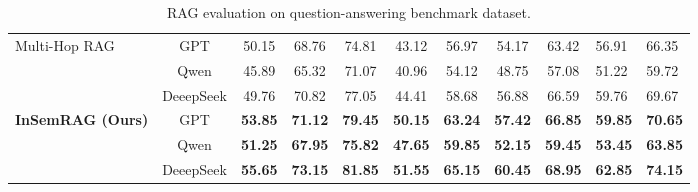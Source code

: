 \begin{table}[!htb]
\begin{threeparttable}
\begin{tabular}{|p{45pt}|c|c|c|c|c|c|c|c|p{30pt}|p{30pt}|}
        \hline
        \multirow{3}{40pt}{Multi-Hop RAG} & GPT & 50.15 & 68.76 & 74.81 & 43.12 & 56.97 & 54.17 & 63.42 & 56.91 & 66.35\\
        & Qwen & 45.89 & 65.32 & 71.07 & 40.96 & 54.12 & 48.75 & 57.08 & 51.22 & 59.72\\
        & DeeepSeek & 49.76 & 70.82 & 77.05 & 44.41 & 58.68 & 56.88 & 66.59 & 59.76 & 69.67\\
        \hline
        \multirow{3}{40pt}{\textbf{InSemRAG (Ours)}} & GPT & \textbf{53.85} & \textbf{71.12} & \textbf{79.45} & \textbf{50.15} & \textbf{63.24} & \textbf{57.42} & \textbf{66.85} & \textbf{59.85} & \textbf{70.65}\\
        & Qwen & \textbf{51.25} & \textbf{67.95} & \textbf{75.82} & \textbf{47.65} & \textbf{59.85} & \textbf{52.15} & \textbf{59.45} & \textbf{53.45} & \textbf{63.85}\\
        & DeeepSeek & \textbf{55.65} & \textbf{73.15} & \textbf{81.85} & \textbf{51.55} & \textbf{65.15} & \textbf{60.45} & \textbf{68.95} & \textbf{62.85} & \textbf{74.15}\\
        \hline
    \end{tabular}
    \caption{RAG evaluation on question-answering benchmark dataset.}
    \label{tab:main1}
    \end{threeparttable}
\end{table}

